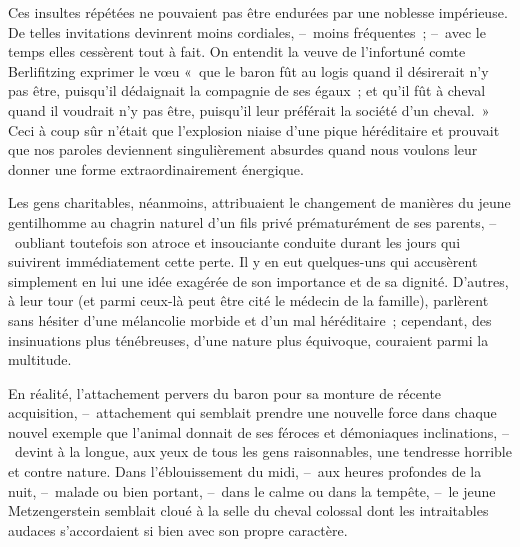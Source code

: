 \documentclass[french,twoside]{book} %
\begin{document}
Ces insultes répétées ne pouvaient pas être endurées par une noblesse impérieuse. De telles invitations devinrent moins cordiales, – moins fréquentes ; – avec le temps elles cessèrent tout à fait. On entendit la veuve de l’infortuné comte Berlifitzing exprimer le vœu « que le baron fût au logis quand il désirerait n’y pas être, puisqu’il dédaignait la compagnie de ses égaux ; et qu’il fût à cheval quand il voudrait n’y pas être, puisqu’il leur préférait la société d’un cheval. » Ceci à coup sûr n’était que l’explosion niaise d’une pique héréditaire et prouvait que nos paroles deviennent singulièrement absurdes quand nous voulons leur donner une forme extraordinairement énergique.\par
Les gens charitables, néanmoins, attribuaient le changement de manières du jeune gentilhomme au chagrin naturel d’un fils privé prématurément de ses parents, – oubliant toutefois son atroce et insouciante conduite durant les jours qui suivirent immédiatement cette perte. Il y en eut quelques-uns qui accusèrent simplement en lui une idée exagérée de son importance et de sa dignité. D’autres, à leur tour (et parmi ceux-là peut être cité le médecin de la famille), parlèrent sans hésiter d’une mélancolie morbide et d’un mal héréditaire ; cependant, des insinuations plus ténébreuses, d’une nature plus équivoque, couraient parmi la multitude.\par
En réalité, l’attachement pervers du baron pour sa monture de récente acquisition, – attachement qui semblait prendre une nouvelle force dans chaque nouvel exemple que l’animal donnait de ses féroces et démoniaques inclinations, – devint à la longue, aux yeux de tous les gens raisonnables, une tendresse horrible et contre nature. Dans l’éblouissement du midi, – aux heures profondes de la nuit, – malade ou bien portant, – dans le calme ou dans la tempête, – le jeune Metzengerstein semblait cloué à la selle du cheval colossal dont les intraitables audaces s’accordaient si bien avec son propre caractère.\par
\end{document}

